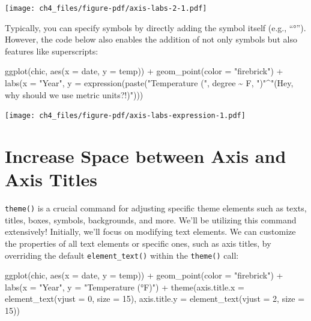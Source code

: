 \documentclass[
  letterpaper,
  DIV=11,
  numbers=noendperiod]{scrreprt}
\newenvironment{Shaded}{\begin{snugshade}}{\end{snugshade}}
\newcommand{\AttributeTok}[1]{\textcolor[rgb]{0.40,0.45,0.13}{#1}}
\newcommand{\DecValTok}[1]{\textcolor[rgb]{0.68,0.00,0.00}{#1}}
\newcommand{\FunctionTok}[1]{\textcolor[rgb]{0.28,0.35,0.67}{#1}}
\newcommand{\NormalTok}[1]{\textcolor[rgb]{0.00,0.23,0.31}{#1}}
\newcommand{\SpecialCharTok}[1]{\textcolor[rgb]{0.37,0.37,0.37}{#1}}
\newcommand{\StringTok}[1]{\textcolor[rgb]{0.13,0.47,0.30}{#1}}
\begin{document}
\texttt{[image: ch4\_files/figure-pdf/axis-labs-2-1.pdf]}

Typically, you can specify symbols by directly adding the symbol itself
(e.g., ``°''). However, the code below also enables the addition of not
only symbols but also features like superscripts:

\begin{Shaded}
\begin{Highlighting}[]
\FunctionTok{ggplot}\NormalTok{(chic, }\FunctionTok{aes}\NormalTok{(}\AttributeTok{x =}\NormalTok{ date, }\AttributeTok{y =}\NormalTok{ temp)) }\SpecialCharTok{+}
  \FunctionTok{geom\_point}\NormalTok{(}\AttributeTok{color =} \StringTok{"firebrick"}\NormalTok{) }\SpecialCharTok{+}
  \FunctionTok{labs}\NormalTok{(}\AttributeTok{x =} \StringTok{"Year"}\NormalTok{, }\AttributeTok{y =} \FunctionTok{expression}\NormalTok{(}\FunctionTok{paste}\NormalTok{(}\StringTok{"Temperature ("}\NormalTok{, degree }\SpecialCharTok{\textasciitilde{}}\NormalTok{ F, }\StringTok{")"}\SpecialCharTok{\^{}}\StringTok{"(Hey, why should we use metric units?!)"}\NormalTok{)))}
\end{Highlighting}
\end{Shaded}

\texttt{[image: ch4\_files/figure-pdf/axis-labs-expression-1.pdf]}

\section{Increase Space between Axis and Axis
Titles}\label{increase-space-between-axis-and-axis-titles}

\texttt{theme()} is a crucial command for adjusting specific theme
elements such as texts, titles, boxes, symbols, backgrounds, and more.
We'll be utilizing this command extensively! Initially, we'll focus on
modifying text elements. We can customize the properties of all text
elements or specific ones, such as axis titles, by overriding the
default \texttt{element\_text()} within the \texttt{theme()} call:

\begin{Shaded}
\begin{Highlighting}[]
\FunctionTok{ggplot}\NormalTok{(chic, }\FunctionTok{aes}\NormalTok{(}\AttributeTok{x =}\NormalTok{ date, }\AttributeTok{y =}\NormalTok{ temp)) }\SpecialCharTok{+}
  \FunctionTok{geom\_point}\NormalTok{(}\AttributeTok{color =} \StringTok{"firebrick"}\NormalTok{) }\SpecialCharTok{+}
  \FunctionTok{labs}\NormalTok{(}\AttributeTok{x =} \StringTok{"Year"}\NormalTok{, }\AttributeTok{y =} \StringTok{"Temperature (°F)"}\NormalTok{) }\SpecialCharTok{+}
  \FunctionTok{theme}\NormalTok{(}\AttributeTok{axis.title.x =} \FunctionTok{element\_text}\NormalTok{(}\AttributeTok{vjust =} \DecValTok{0}\NormalTok{, }\AttributeTok{size =} \DecValTok{15}\NormalTok{),}
        \AttributeTok{axis.title.y =} \FunctionTok{element\_text}\NormalTok{(}\AttributeTok{vjust =} \DecValTok{2}\NormalTok{, }\AttributeTok{size =} \DecValTok{15}\NormalTok{))}
\end{Highlighting}
\end{Shaded}
\end{document}
